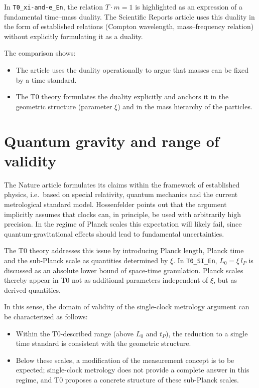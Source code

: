 In \texttt{T0\_xi-and-e\_En}, the relation $T \cdot m = 1$ is highlighted as an
expression of a fundamental time–mass duality. The Scientific Reports article
uses this duality in the form of established relations (Compton wavelength,
mass–frequency relation) without explicitly formulating it as a duality.

The comparison shows:
\begin{itemize}
  \item The article uses the duality operationally to argue that masses can be
        fixed by a time standard.
  \item The T0 theory formulates the duality explicitly and anchors it in the
        geometric structure (parameter $\xi$) and in the mass hierarchy of the
        particles.
\end{itemize}

\section{Quantum gravity and range of validity}
\label{sec:qg_range}

The Nature article formulates its claims within the framework of established
physics, i.e.\ based on special relativity, quantum mechanics and the current
metrological standard model. Hossenfelder points out that the argument
implicitly assumes that clocks can, in principle, be used with arbitrarily high
precision. In the regime of Planck scales this expectation will likely fail,
since quantum-gravitational effects should lead to fundamental uncertainties.

The T0 theory addresses this issue by introducing Planck length, Planck time
and the sub-Planck scale as quantities determined by $\xi$. In
\texttt{T0\_SI\_En}, $L_0 = \xi\,l_P$ is discussed as an absolute lower bound of
space-time granulation. Planck scales thereby appear in T0 not as additional
parameters independent of $\xi$, but as derived quantities.

In this sense, the domain of validity of the single-clock metrology argument
can be characterized as follows:
\begin{itemize}
  \item Within the T0-described range (above $L_0$ and $t_P$), the reduction to
        a single time standard is consistent with the geometric structure.
  \item Below these scales, a modification of the measurement concept is to be
        expected; single-clock metrology does not provide a complete answer in
        this regime, and T0 proposes a concrete structure of these
        sub-Planck scales.
\end{itemize}

